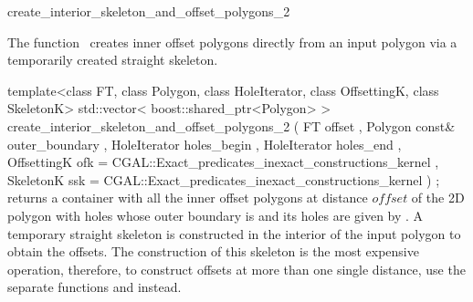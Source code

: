 

\begin{ccRefFunction}{create_interior_skeleton_and_offset_polygons_2}


\ccDefinition

The function \ccRefName\ creates inner offset polygons directly from an input polygon via a temporarily created straight skeleton. 


\ccFunction
{template<class FT, class Polygon, class HoleIterator, class OffsettingK, class SkeletonK>
std::vector< boost::shared_ptr<Polygon> >
create_interior_skeleton_and_offset_polygons_2 ( FT             offset
                                               , Polygon const& outer_boundary
                                               , HoleIterator   holes_begin
                                               , HoleIterator   holes_end
                                               , OffsettingK   ofk 
                                                  = CGAL::Exact_predicates_inexact_constructions_kernel
                                               , SkeletonK      ssk 
                                                  = CGAL::Exact_predicates_inexact_constructions_kernel
                                               ) ;
}
{returns a container with all the inner offset polygons at distance $offset$ of the 2D polygon with holes whose outer boundary is  and its holes are given by .
A temporary straight skeleton is constructed in the interior of the input polygon to obtain the offsets. The construction of this skeleton is the most expensive operation, therefore, to construct offsets at more than one single distance, use the separate functions  and  instead.}


\end{ccRefFunction}
